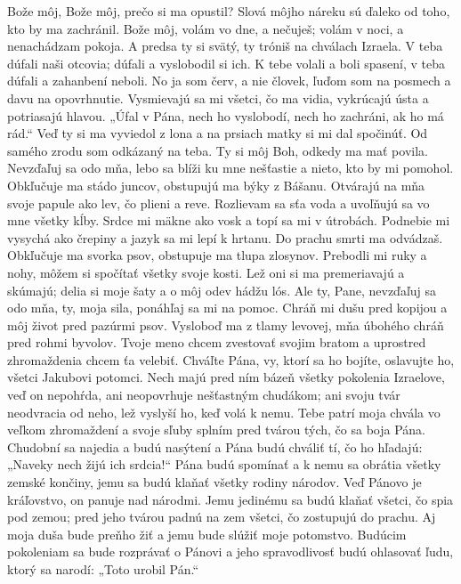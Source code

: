 Bože môj, Bože môj, prečo si ma opustil?
Slová môjho náreku sú ďaleko od toho,
kto by ma zachránil.
\versseparator
Bože môj, volám vo dne, a nečuješ;
volám v noci, a nenachádzam pokoja.
\versseparator
A predsa ty si svätý,
ty tróniš na chválach Izraela.
\versseparator
V teba dúfali naši otcovia;
dúfali a vyslobodil si ich.
\versseparator
K tebe volali a boli spasení,
v teba dúfali a zahanbení neboli.
\versseparator
No ja som červ, a nie človek,
ľuďom som na posmech a davu na opovrhnutie.
\versseparator
Vysmievajú sa mi všetci, čo ma vidia,
vykrúcajú ústa a potriasajú hlavou.
\versseparator
„Úfal v Pána, nech ho vyslobodí,
nech ho zachráni, ak ho má rád.“
\versseparator
Veď ty si ma vyviedol z lona
a na prsiach matky si mi dal spočinúť.
Od samého zrodu som odkázaný na teba.
\versseparator
Ty si môj Boh, odkedy ma mať povila.
Nevzďaľuj sa odo mňa,
\versseparator
lebo sa blíži ku mne nešťastie
a nieto, kto by mi pomohol.
\versseparator
Obkľučuje ma stádo juncov,
obstupujú ma býky z Bášanu.
\versseparator
Otvárajú na mňa svoje papule
ako lev, čo plieni a reve.
\versseparator
Rozlievam sa sťa voda
a uvoľňujú sa vo mne všetky kĺby.
\versseparator
Srdce mi mäkne ako vosk
a topí sa mi v útrobách.
\versseparator
Podnebie mi vysychá ako črepiny
a jazyk sa mi lepí k hrtanu.
Do prachu smrti ma odvádzaš.
\versseparator
Obkľučuje ma svorka psov,
obstupuje ma tlupa zlosynov.
\versseparator
Prebodli mi ruky a nohy,
môžem si spočítať všetky svoje kosti.
\versseparator
Lež oni si ma premeriavajú a skúmajú;
delia si moje šaty
a o môj odev hádžu lós.
\versseparator
Ale ty, Pane, nevzďaľuj sa odo mňa,
ty, moja sila, ponáhľaj sa mi na pomoc.
\versseparator
Chráň mi dušu pred kopijou
a môj život pred pazúrmi psov.
\versseparator
Vysloboď ma z tlamy levovej,
mňa úbohého chráň pred rohmi byvolov.
\versseparator
Tvoje meno chcem zvestovať svojim bratom
a uprostred zhromaždenia chcem ťa velebiť.
\versseparator
Chváľte Pána, vy, ktorí sa ho bojíte,
oslavujte ho, všetci Jakubovi potomci.
\versseparator
Nech majú pred ním bázeň všetky pokolenia Izraelove,
veď on nepohŕda, ani neopovrhuje nešťastným chudákom;
\versseparator
ani svoju tvár neodvracia od neho,
lež vyslyší ho, keď volá k nemu.
\versseparator
Tebe patrí moja chvála vo veľkom zhromaždení
a svoje sľuby splním pred tvárou tých, čo sa boja Pána.
\versseparator
Chudobní sa najedia a budú nasýtení
a Pána budú chváliť tí, čo ho hľadajú:
„Naveky nech žijú ich srdcia!“
\versseparator
Pána budú spomínať a k nemu sa obrátia
všetky zemské končiny,
\versseparator
jemu sa budú klaňať
všetky rodiny národov.
\versseparator
Veď Pánovo je kráľovstvo,
on panuje nad národmi.
\versseparator
Jemu jedinému sa budú klaňať všetci, čo spia pod zemou;
pred jeho tvárou padnú na zem všetci, čo zostupujú do prachu.
\versseparator
Aj moja duša bude preňho žiť
a jemu bude slúžiť moje potomstvo.
\versseparator
Budúcim pokoleniam sa bude rozprávať o Pánovi
a jeho spravodlivosť budú ohlasovať ľudu, ktorý sa narodí:
„Toto urobil Pán.“ 
